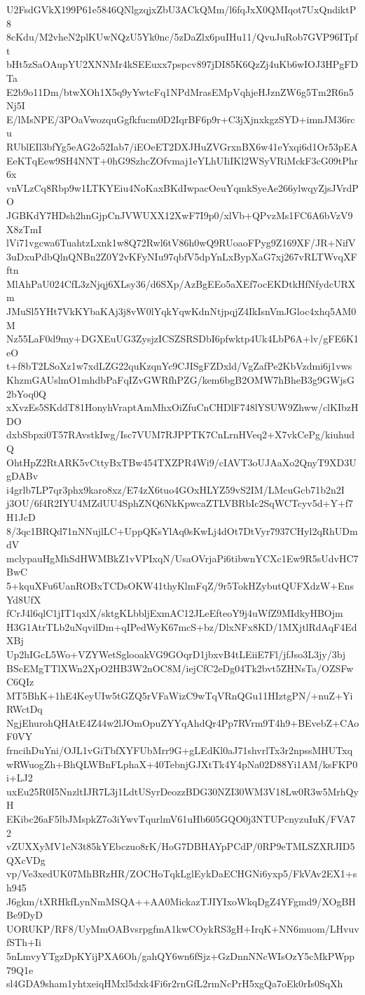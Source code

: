 U2FsdGVkX199P61e5846QNlgzqjxZbU3ACkQMm/l6fqJxX0QMIqot7UxQndiktP8
8cKdu/M2vheN2plKUwNQzU5Yk0nc/5zDaZlx6puIHu11/QvuJuRob7GVP96ITpft
bHt5zSaOAupYU2XNNMr4kSEEuxx7pspcv897jDI85K6QzZj4uKb6wIOJ3HPgFDTa
E2b9o11Dm/btwXOh1X5q9yYwtcFq1NPdMrasEMpVqhjeHJznZW6g5Tm2R6n5Nj5I
E/lMsNPE/3POaVwozquGgfkfucm0D2IqrBF6p9r+C3jXjnxkgzSYD+imnJM36rcu
RUblEIl3bfYg5eAG2o52Iab7/iEOeET2DXJHuZVGrxnBX6w41eYxqi6d1Or53pEA
EeKTqEew9SH4NNT+0hG9SzhcZOfvmaj1eYLhUIiIKl2WSyVRiMckF3cG09tPhr6x
vnVLzCq8Rbp9w1LTKYEiu4NoKaxBKdIwpacOeuYqmkSyeAe266ylwqyZjsJVrdPO
JGBKdY7HDsh2hnGjpCnJVWUXX12XwF7I9p0/xlVb+QPvzMs1FC6A6bVzV9X8zTmI
lVi71vgcwa6TuahtzLxnk1w8Q72Rwl6tV86h0wQ9RUoaoFPyg9Z169XF/JR+NifV
3uDxuPdbQlnQNBn2Z0Y2vKFyNIu97qbfV5dpYnLxBypXaG7xj267vRLTWvqXFftn
MlAhPaU024CfL3zNjqj6XLsy36/d6SXp/AzBgEEo5aXEf7ocEKDtkHfNfydcURXm
JMuSl5YHt7VkKYbaKAj3j8vW0lYqkYqwKdnNtjpqjZ4IkIsnVmJGloc4xhq5AM0M
Nz55LaF0d9my+DGXEuUG3ZysjzICSZSRSDbI6pfwktp4Uk4LbP6A+lv/gFE6K1eO
t+f8bT2LSoXz1w7xdLZG22quKzqnYc9CJISgFZDxld/VgZafPe2KbVzdmi6j1vws
KhzmGAUslmO1mhdbPaFqIZvGWRfhPZG/kem6bgB2OMW7hBheB3g9GWjsG2bYoq0Q
xXvzEs5SKddT81HonyhVraptAmMhxOiZfuCnCHDlF748lYSUW9Zhww/clKIbzHDO
dxbSbpxi0T57RAvstkIwg/Isc7VUM7RJPPTK7CnLrnHVeq2+X7vkCePg/kiuhudQ
OhtHpZ2RtARK5vCttyBxTBw454TXZPR4Wi9/cIAVT3oUJAaXo2QnyT9XD3UgDABv
i4grlb7LP7qr3phx9karo8xz/E74zX6tuo4GOxHLYZ59vS2IM/LMcuGcb71b2n2I
j3OU/6f4R2IYU4MZdUU4SphZNQ6NkKpwcaZTLVBRbIc2SqWCTcyv5d+Y+f7H1JcD
8/3qc1BRQd71nNNujlLC+UppQKsYlAq0sKwLj4dOt7DtVyr7937CHyl2qRhUDmdV
mclypauHgMhSdHWMBkZ1vVPIxqN/UsaOVrjaPi6tibwnYCXc1Ew9R5sUdvHC7BwC
5+kquXFu6UanROBxTCDsOKW41thyKlmFqZ/9r5TokHZybutQUFXdzW+EnsYd8UfX
fCrJ4l6qlC1jIT1qxlX/sktgKLbbljExmAC12JLeEfteoY9j4uWfZ9MIdkyHBOjm
H3G1AtrTLb2uNqvilDm+qIPedWyK67mcS+bz/DlxNFx8KD/1MXjtlRdAqF4EdXBj
Up2hIGcL5Wo+VZYWetSglooakVG9GOqrD1jbxvB4tLEiiE7Fl/jfJso3L3jy/3bj
BScEMgTTlXWn2XpO2HB3W2nOC8M/iejCfC2eDg04Tk2bvt5ZHNsTa/OZSFwC6QIz
MT5BhK+1hE4KeyUIw5tGZQ5rVFaWizC9wTqVRnQGu11HIztgPN/+nuZ+YiRWctDq
NgjEhurohQHAtE4Z44w2lJOmOpuZYYqAhdQr4Pp7RVrm9T4h9+BEvebZ+CAoF0VY
frncihDuYni/OJL1vGiTbfXYFUbMrr9G+gLEdKl0aJ71shvrlTx3r2npssMHUTxq
wRWuogZh+BhQLWBnFLphaX+40TebnjGJXtTk4Y4pNa02D88Yi1AM/ksFKP0i+LJ2
uxEu25R0I5NnzltIJR7L3j1LdtUSyrDeozzBDG30NZI30WM3V18Lw0R3w5MrhQyH
EKibc26aF5lbJMspkZ7o3iYwvTqurlmV61uHb605GQO0j3NTUPcnyzuIuK/FVA72
vZUXXyMV1eN3t85kYEbczuo8rK/HoG7DBHAYpPCdP/0RP9eTMLSZXRJID5QXcVDg
vp/Ve3xedUK07MhBRzHR/ZOCHoTqkLglEykDaECHGNi6yxp5/FkVAv2EX1+sh945
J6gkm/tXRHkfLynNmMSQA++AA0MickazTJIYIxoWkqDgZ4YFgmd9/XOgBHBe9DyD
UORUKP/RF8/UyMmOABvsrpgfmA1kwCOykRS3gH+IrqK+NN6muom/LHvuvfSTh+Ii
5nLmvyYTgzDpKYijPXA6Oh/gahQY6wn6fSjz+GzDnnNNcWIsOzY5cMkPWpp79Q1e
sl4GDA9sham1yhtxeiqHMxl5dxk4Fi6r2rnGfL2rmNcPrH5xgQa7oEk0rIs0SqXh
